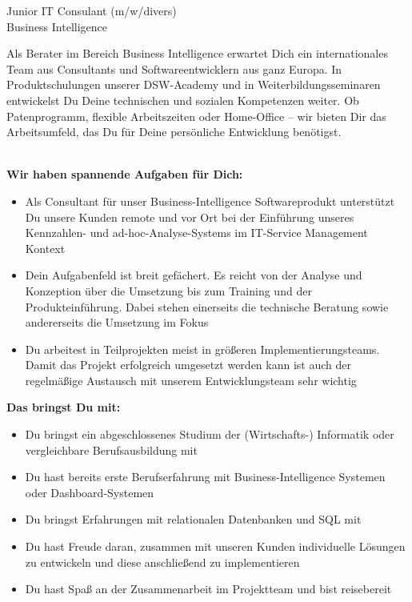 \documentclass[12pt,utf8]{scrartcl}
\begin{document}
\begin{flushleft}
\large
\begin{center}Junior IT Consulant (m/w/divers) \\Business Intelligence\end{center}

\scriptsize
Als Berater im Bereich Business Intelligence erwartet Dich ein internationales Team aus Consultants und Softwareentwicklern aus ganz Europa. In Produktschulungen unserer DSW-Academy und in Weiterbildungsseminaren entwickelst Du Deine technischen und sozialen Kompetenzen weiter. Ob Patenprogramm, flexible Arbeitszeiten oder Home-Office – wir bieten Dir das Arbeitsumfeld, das Du für Deine persönliche Entwicklung benötigst.


\textbf{\\Wir haben spannende Aufgaben für Dich:}
\begin{center}
	\begin{itemize}
		\item Als Consultant für unser Business-Intelligence Softwareprodukt unterstützt Du unsere Kunden remote und vor Ort bei der Einführung unseres Kennzahlen- und ad-hoc-Analyse-Systems im IT-Service Management Kontext
		\item Dein Aufgabenfeld ist breit gefächert. Es reicht von der Analyse und Konzeption über die Umsetzung bis zum Training und der Produkteinführung. Dabei stehen einerseits die technische Beratung sowie andererseits die Umsetzung im Fokus
		\item Du arbeitest in Teilprojekten meist in größeren Implementierungsteams. Damit das Projekt erfolgreich umgesetzt werden kann ist auch der regelmäßige Austausch mit unserem Entwicklungsteam sehr wichtig
	\end{itemize}
\end{center}

\textbf{Das bringst Du mit:}
\begin{center}
	\begin{itemize}
		\item Du bringst ein abgeschlossenes Studium der (Wirtschafts-) Informatik oder vergleichbare Berufsausbildung mit
		\item Du hast bereits erste Berufserfahrung mit Business-Intelligence Systemen oder Dashboard-Systemen
		\item Du bringst Erfahrungen mit relationalen Datenbanken und SQL mit
		\item Du hast Freude daran, zusammen mit unseren Kunden individuelle Lösungen zu entwickeln und diese anschließend zu implementieren
		\item Du hast Spaß an der Zusammenarbeit im Projektteam und bist reisebereit
	\end{itemize}
\end{center}


\end{flushleft}
\end{document}
